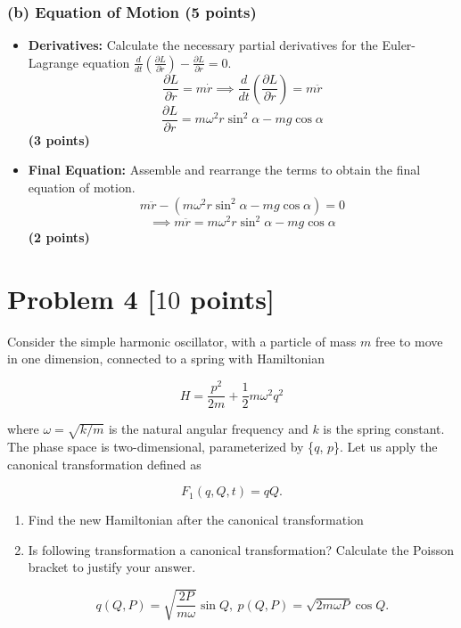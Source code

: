 \documentclass[11pt, a4paper]{article} %
\begin{document}
\subsubsection*{(b) Equation of Motion (5 points)}
\begin{itemize}
    \item \textbf{Derivatives:} Calculate the necessary partial derivatives for the Euler-Lagrange equation $\frac{d}{dt}(\frac{\partial L}{\partial \dot{r}}) - \frac{\partial L}{\partial r} = 0$.
    \[
    \frac{\partial L}{\partial \dot{r}} = m\dot{r} \implies \frac{d}{dt}\left(\frac{\partial L}{\partial \dot{r}}\right) = m\ddot{r}
    \]
    \[
    \frac{\partial L}{\partial r} = m \omega^2 r \sin^2 \alpha - m g \cos \alpha
    \]
    \hfill \textbf{(3 points)} \\

    \item \textbf{Final Equation:} Assemble and rearrange the terms to obtain the final equation of motion.
    \[
    m\ddot{r} - (m \omega^2 r \sin^2 \alpha - m g \cos \alpha) = 0
    \]
    \[
    \implies m\ddot{r} = m \omega^2 r \sin^2 \alpha - m g \cos \alpha
    \]
    \hfill \textbf{(2 points)} \\
\end{itemize}

\newpage
\section*{Problem 4 [$10$ points]}
Consider the simple harmonic oscillator, with a particle of mass $m$ free to move in one dimension, connected to a spring with Hamiltonian

\begin{equation*}
    H = \frac{p^2}{2m} + \frac{1}{2}m\omega^2q^2
\end{equation*}

where $\omega = \sqrt{k/m}$ is the natural angular frequency and $k$ is the spring constant. The phase space is two-dimensional, parameterized by \{$q$, $p$\}. Let us apply the canonical transformation defined as

\begin{equation*}
    F_1(q, Q, t) = qQ.
\end{equation*}

\begin{enumerate}
\item[(1)] Find the new Hamiltonian after the canonical transformation

\item[(2)]  Is following transformation a canonical transformation? Calculate the Poisson bracket to justify your answer. 

\begin{equation*}
    q(Q, P) = \sqrt{\frac{2P}{m\omega}}\sin{Q},\ p(Q, P) = \sqrt{2m\omega P}\cos{Q}.
\end{equation*}
\end{enumerate}
\end{document}
